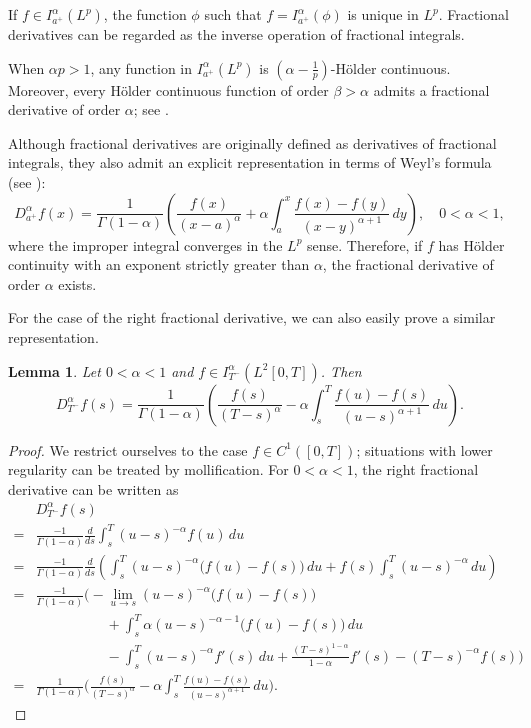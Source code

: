 \documentclass[preprint,12pt]{elsarticle}
\newtheorem{lemma}[theorem]{Lemma}
\theoremstyle{definition}  %
\theoremstyle{plain}  %
\begin{document}
	If $f\in I_{a^+}^\alpha(L^p) $, the function $ \phi $ such that $f=I_{a^+}^\alpha(\phi)$ is unique in $L^p $. Fractional derivatives can be regarded as the inverse operation of fractional integrals.
 
 When $\alpha p > 1$, any function in $I_{a^+}^\alpha(L^p)$ is 
$(\alpha - \tfrac{1}{p})$-H\"older continuous. Moreover, every H\"older continuous 
function of order $\beta > \alpha$ admits a fractional derivative of order 
$\alpha$; see \cite[Proposition~2.1]{Decreusefond1999}.

Although fractional derivatives are originally defined as derivatives of 
fractional integrals, they also admit an explicit representation in terms of 
Weyl’s formula (see \cite[Remark~5.3]{Samko1993}):
\begin{equation}
D^\alpha_{a^+} f(x) 
= \frac{1}{\Gamma(1-\alpha)} \left( \frac{f(x)}{(x-a)^\alpha} 
+ \alpha \int_a^x \frac{f(x) - f(y)}{(x-y)^{\alpha+1}}\,dy \right), 
\quad 0<\alpha<1,
\label{Weyl}
\end{equation}
where the improper integral converges in the $L^p$ sense. Therefore, if \( f \) has H\"older continuity with an exponent strictly greater than \( \alpha \),  the fractional derivative of order \( \alpha \) exists.

  	For the case of the right fractional derivative, we can also easily prove a similar representation.
    \begin{lemma}
Let $0<\alpha<1$ and $f \in I_{T^-}^\alpha\!\left(L^2[0,T]\right)$. Then
\begin{equation}
D_{T^-}^\alpha f(s) 
= \frac{1}{\Gamma(1-\alpha)} \left(
    \frac{f(s)}{(T-s)^\alpha}
    - \alpha \int_s^T \frac{f(u)-f(s)}{(u-s)^{\alpha+1}}\,du
  \right).
\end{equation}
\end{lemma}

	\begin{proof}
	We restrict ourselves to the case $f \in C^1([0,T])$; situations with lower 
regularity can be treated by mollification. For $0<\alpha<1$, the right fractional derivative can be written as
\begin{align*}
&D^\alpha_{T^-} f(s)\\ 
=& \frac{-1}{\Gamma(1-\alpha)} \frac{d}{ds}\int_s^T (u-s)^{-\alpha} f(u)\,du \\
=& \frac{-1}{\Gamma(1-\alpha)} \frac{d}{ds}\left(
      \int_s^T (u-s)^{-\alpha}\big(f(u)-f(s)\big)\,du
      + f(s)\int_s^T (u-s)^{-\alpha}\,du \right) \\
=& \frac{-1}{\Gamma(1-\alpha)} \Bigg(
     - \lim_{u\to s} (u-s)^{-\alpha}\big(f(u)-f(s)\big) \\
    &\qquad\qquad\quad+ \int_s^T \alpha (u-s)^{-\alpha-1}\big(f(u)-f(s)\big)\,du \\
&\qquad\qquad\quad - \int_s^T (u-s)^{-\alpha} f'(s)\,du
     + \frac{(T-s)^{1-\alpha}}{1-\alpha} f'(s)
     - (T-s)^{-\alpha} f(s) \Bigg) \\
=& \frac{1}{\Gamma(1-\alpha)} \Bigg(
     \frac{f(s)}{(T-s)^\alpha}
     - \alpha \int_s^T \frac{f(u)-f(s)}{(u-s)^{\alpha+1}}\,du
   \Bigg).
\end{align*}

	\end{proof}
\end{document}
